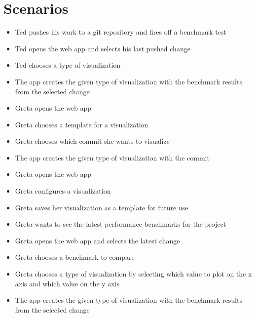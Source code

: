 \section{Scenarios}

\begin{itemize}
	\item Ted pushes his work to a git repository and fires off a benchmark test
	\item Ted opens the web app and selects his last pushed change
	\item Ted chooses a type of \gls{visualization}
	\item The app creates the given type of \gls{visualization} with the benchmark results from the selected change
\end{itemize}

\begin{itemize}
	\item Greta opens the web app
	\item Greta chooses a \gls{template} for a \gls{visualization}
	\item Greta chooses which commit she wants to visualize
	\item The app creates the given type of \gls{visualization} with the commit
\end{itemize}

\begin{itemize}
	\item Greta opens the web app
	\item Greta configures a visualization
	\item Greta saves her visualization as a \gls{template} for future use
\end{itemize}

\begin{itemize}
	\item Greta wants to see the latest performance benchmarks for the project
	\item Greta opens the web app and selects the latest change
	\item Greta chooses a benchmark to compare
	\item Greta chooses a type of \gls{visualization} by selecting which value to plot on the x axis and which value on the y axis
	\item The app creates the given type of \gls{visualization} with the benchmark results from the selected change
\end{itemize}

